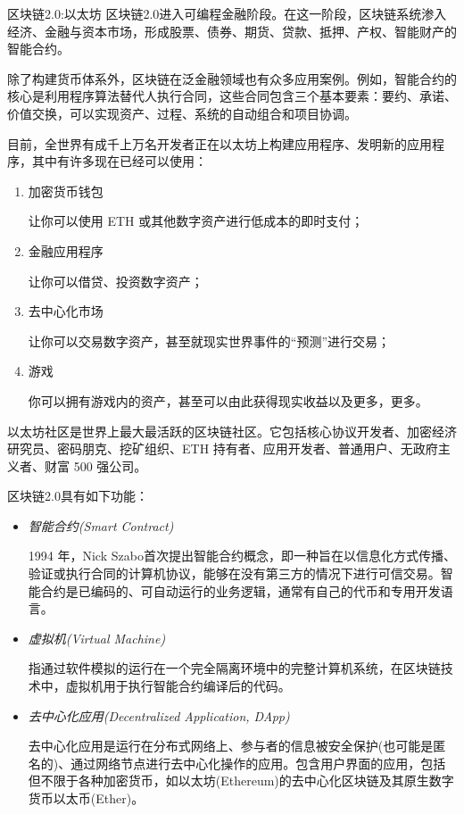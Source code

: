 \documentclass[11pt]{beamer}
\begin{document}
\begin{frame}[allowframebreaks]{区块链2.0:以太坊}
	区块链2.0进入可编程金融阶段。在这一阶段，区块链系统渗入经济、金融与资本市场，形成股票、债券、期货、贷款、抵押、产权、智能财产的智能合约。
	
	除了构建货币体系外，区块链在泛金融领域也有众多应用案例。例如，智能合约的核心是利用程序算法替代人执行合同，这些合同包含三个基本要素：要约、承诺、价值交换，可以实现资产、过程、系统的自动组合和项目协调。
	
	\newpage
	
		目前，全世界有成千上万名开发者正在以太坊上构建应用程序、发明新的应用程序，其中有许多现在已经可以使用：
		\begin{enumerate}
			\item 	加密货币钱包
			
			{\tiny 让你可以使用 ETH 或其他数字资产进行低成本的即时支付；}
			\item 	金融应用程序
			
			让你可以借贷、投资数字资产；
			\item 	去中心化市场
			
			{\tiny 让你可以交易数字资产，甚至就现实世界事件的“预测”进行交易；}
			\item 	游戏
			
			{\tiny 你可以拥有游戏内的资产，甚至可以由此获得现实收益以及更多，更多。}
		\end{enumerate}
		{\footnotesize 以太坊社区是世界上最大最活跃的区块链社区。它包括核心协议开发者、加密经济研究员、密码朋克、挖矿组织、ETH 持有者、应用开发者、普通用户、无政府主义者、财富 500 强公司。}
	
	\newpage
	
	区块链2.0具有如下功能：
	\begin{itemize}
		\item \textsl{智能合约(Smart Contract)} 
		
		{\tiny 1994 年，Nick Szabo首次提出智能合约概念，即一种旨在以信息化方式传播、验证或执行合同的计算机协议，能够在没有第三方的情况下进行可信交易。智能合约是已编码的、可自动运行的业务逻辑，通常有自己的代币和专用开发语言。}
		\item \textsl{虚拟机(Virtual Machine)}
		
		 	{\tiny 指通过软件模拟的运行在一个完全隔离环境中的完整计算机系统，在区块链技术中，虚拟机用于执行智能合约编译后的代码。}
		\item \textsl{去中心化应用(Decentralized Application, DApp)} 
		
			{\tiny 去中心化应用是运行在分布式网络上、参与者的信息被安全保护(也可能是匿名的)、通过网络节点进行去中心化操作的应用。包含用户界面的应用，包括但不限于各种加密货币，如以太坊(Ethereum)的去中心化区块链及其原生数字货币以太币(Ether)。}
	\end{itemize}
\end{frame}
\end{document}
